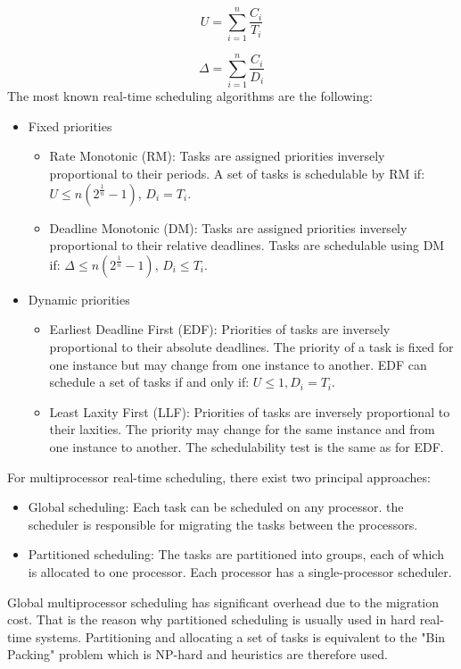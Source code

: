 \begin{equation}
U = \sum_{i=1}^{n}\frac{C_i}{T_i}
\end{equation}

\begin{equation}
\Delta = \sum_{i=1}^{n}\frac{C_i}{D_i}
\end{equation}
The most known real-time scheduling algorithms are the following:

\begin{itemize}
\item Fixed priorities
\begin{itemize}
\item Rate Monotonic (RM): Tasks are assigned priorities inversely proportional to their periods. A set of tasks is schedulable by RM if: $U \leq n(2^{\frac{1}{n}}-1)$, $D_i = T_i$. 
\item Deadline Monotonic (DM): Tasks are assigned priorities inversely proportional to their relative deadlines. Tasks are schedulable using DM if: $\Delta \leq n(2^{\frac{1}{n}}-1)$, $D_i \leq T_i$. 
\end{itemize}
\item Dynamic priorities
\begin{itemize}
\item Earliest Deadline First (EDF): Priorities of tasks are inversely proportional to their absolute deadlines. The priority of a task is fixed for one instance but may change from one instance to another. EDF can schedule a set of tasks if and only if: $U \leq 1, D_i = T_i$.
\item Least Laxity First (LLF): Priorities of tasks are inversely proportional to their laxities. The priority may change for the same instance and from one instance to another. The schedulability test is the same as for EDF.
\end{itemize}
\end{itemize}
 For multiprocessor real-time scheduling, there exist two principal approaches:

\begin{itemize}
\item Global scheduling: Each task can be scheduled on any processor. the scheduler is responsible for migrating the tasks between the processors.
\item Partitioned scheduling: The tasks are partitioned into groups, each of which is allocated to one processor. Each processor has a single-processor scheduler. 
\end{itemize}
Global multiprocessor scheduling has significant overhead due to the migration cost. That is the reason why partitioned scheduling is usually used in hard real-time systems. Partitioning and allocating a set of tasks is equivalent to the "Bin Packing" problem which is NP-hard and heuristics are therefore used. 

